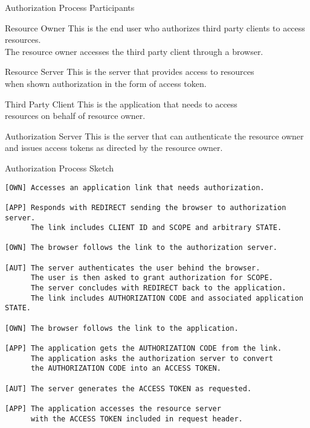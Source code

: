 \begin{frame}{Authorization Process Participants}
    \begin{block}{Resource Owner}
        This is the end user who authorizes third party clients to access resources. \\
        The resource owner accesses the third party client through a browser.
    \end{block}
    \begin{block}{Resource Server}
        This is the server that provides access to resources \\
        when shown authorization in the form of access token.
    \end{block}
    \begin{block}{Third Party Client}
        This is the application that needs to access \\
        resources on behalf of resource owner.
    \end{block}
    \begin{block}{Authorization Server}
        This is the server that can authenticate the resource owner \\
        and issues access tokens as directed by the resource owner.
    \end{block}
\end{frame}


\begin{frame}[fragile]{Authorization Process Sketch}
\begin{lstlisting}[style=mini]
[OWN] Accesses an application link that needs authorization.

[APP] Responds with REDIRECT sending the browser to authorization server.
      The link includes CLIENT ID and SCOPE and arbitrary STATE.

[OWN] The browser follows the link to the authorization server.

[AUT] The server authenticates the user behind the browser.
      The user is then asked to grant authorization for SCOPE.
      The server concludes with REDIRECT back to the application.
      The link includes AUTHORIZATION CODE and associated application STATE.

[OWN] The browser follows the link to the application.

[APP] The application gets the AUTHORIZATION CODE from the link.
      The application asks the authorization server to convert
      the AUTHORIZATION CODE into an ACCESS TOKEN.

[AUT] The server generates the ACCESS TOKEN as requested.

[APP] The application accesses the resource server
      with the ACCESS TOKEN included in request header.
\end{lstlisting}
\end{frame}


